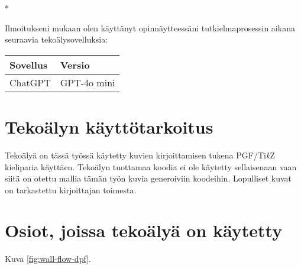\begin{aidisclaimer} * %

Ilmoitukseni mukaan olen käyttänyt opinnäytteessäni tutkielmaprosessin aikana
seuraavia tekoälysovelluksia:

\begin{center}
    \begin{tabularx}{\linewidth}{X|l}
        \toprule
        \textbf{Sovellus} & \textbf{Versio} \\
        \midrule
        ChatGPT & GPT-4o mini \\
        \bottomrule
    \end{tabularx}
\end{center}

\section*{Tekoälyn käyttötarkoitus}

Tekoälyä on tässä työssä käytetty kuvien kirjoittamisen tukena PGF/Ti\emph{k}Z kieliparia käyttäen. Tekoälyn tuottamaa koodia ei ole käytetty sellaisenaan vaan 
siitä on otettu mallia tämän työn kuvia generoiviin koodeihin.
Lopulliset kuvat on tarkastettu kirjoittajan toimesta.

\section*{Osiot, joissa tekoälyä on käytetty}

Kuva \ref{fig:wall-flow-dpf}.

\end{aidisclaimer}

